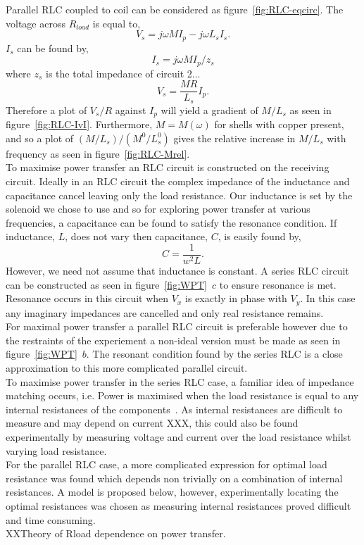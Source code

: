 \documentclass[11pt]{iopart}
\begin{document}
Parallel RLC coupled to coil can be considered as
figure~\ref{fig:RLC-eqcirc}.  The voltage across $R_{load}$ is equal
to,
$$ V_s = j\omega MI_p - j\omega L_sI_s.$$
$I_s$ can be found by,
$$ I_s = j\omega MI_p / z_s $$
where $z_s$ is the total impedance of circuit 2...
\begin{equation}
V_s = \frac{MR}{L_s}I_p.
\label{eqn:RLC-M}
\end{equation}
Therefore a plot of $V_s / R$ against $I_p$ will yield a gradient of
$M/L_s$ as seen in figure~\ref{fig:RLC-IvI}.  Furthermore, $M =
M(\omega)$ for shells with copper present, and so a plot of
$(M/L_s)/(M^0/L_s^0)$ gives the relative increase in $M/L_s$ with
frequency as seen in figure~\ref{fig:RLC-Mrel}.\\


To maximise power transfer an RLC circuit is constructed on the
receiving circuit. Ideally in an RLC circuit the complex impedance of
the inductance and capacitance cancel leaving only the load
resistance. Our inductance is set by the solenoid we chose to use and
so for exploring power transfer at various frequencies, a capacitance
can be found to satisfy the resonance condition. If inductance, $L$,
does not vary then capacitance, $C$, is easily found by,
\begin{equation}
  C = \frac{1}{w^2L}.
\end{equation}
However, we need not assume that inductance is constant. A series RLC
circuit can be constructed as seen in figure~\ref{fig:WPT}~$c$ to
ensure resonance is met. Resonance occurs in this circuit when $V_x$
is exactly in phase with $V_y$. In this case any imaginary impedances
are cancelled and only real resistance remains. \\ For maximal power
transfer a parallel RLC circuit is preferable however due to the
restraints of the experiement a non-ideal version must be made as seen
in figure~\ref{fig:WPT}~$b$. The resonant condition found by the
series RLC is a close approximation to this more complicated parallel
circuit. \\
To maximise power transfer in the series RLC case, a familiar idea of
impedance matching occurs, i.e. Power is maximised when the load
resistance is equal to any internal resistances of the
components~\cite{XXX}. As internal resistances are difficult to
measure and may depend on current XXX, this could also be found
experimentally by measuring voltage and current over the load
resistance whilst varying load resistance. \\ For the parallel RLC
case, a more complicated expression for optimal load resistance was
found which depends non trivially on a combination of internal
resistances. A model is proposed below, however, experimentally
locating the optimal resistances was chosen as measuring internal
resistances proved difficult and time consuming.\\
XXTheory of Rload dependence on power transfer. \\
\end{document}
